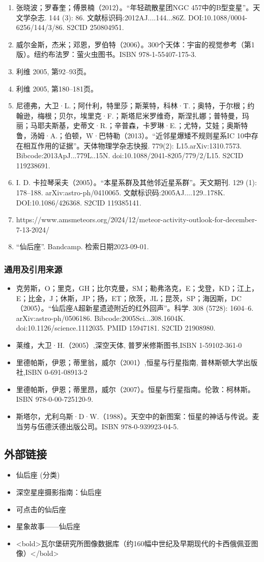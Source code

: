 \begin{enumerate}
\item 张晓波；罗春奎；傅景楠（2012）。“年轻疏散星团NGC 457中的B型变星”。天文学杂志. 144 (3): 86. 文献标识码:2012AJ....144...86Z. DOI:10.1088/0004-6256/144/3/86. S2CID 250804951.
\item 威尔金斯，杰米；邓恩，罗伯特（2006）。300个天体：宇宙的视觉参考（第1版）。纽约布法罗：萤火虫图书。ISBN 978-1-55407-175-3.
\item 利维 2005, 第92–93页。
\item 利维 2005, 第180–181页。
\item 尼德弗，大卫·L.；阿什利，特里莎；斯莱特，科林·T.；奥特，于尔根；约翰逊，梅根；贝尔，埃里克·F.；斯塔尼米罗维奇，斯涅扎娜；普特曼，玛丽；马耶夫斯基，史蒂文·R.；辛普森，卡罗琳·E.；尤特，艾娃；奥斯特鲁，汤姆·A.；伯顿，W·巴特勒（2013）。“近邻星爆矮不规则星系IC 10中存在相互作用的证据”。天体物理学杂志快报. 779(2): L15.arXiv:1310.7573. Bibcode:2013ApJ...779L..15N. doi:10.1088/2041-8205/779/2/L15. S2CID 119238691.
\item I. D. 卡拉琴采夫（2005）。“本星系群及其他邻近星系群”。天文期刊. 129 (1): 178–188. arXiv:astro-ph/0410065. 文献标识码:2005AJ....129..178K. DOI:10.1086/426368. S2CID 119385141.
\item https://www.amsmeteors.org/2024/12/meteor-activity-outlook-for-december-7-13-2024/
\item “仙后座”. Bandcamp. 检索日期2023-09-01.
\end{enumerate}
\subsubsection{通用及引用来源}
\begin{itemize}
\item 克劳斯，O；里克，GH；比尔克曼，SM；勒弗洛克，E；戈登，KD；江上，E；比金，J；休斯，JP；扬，ET；欣茨，JL；昆茨，SP；海因斯，DC（2005）。“仙后座A超新星遗迹附近的红外回声”。科学. 308 (5728): 1604–6. arXiv:astro-ph/0506186. Bibcode:2005Sci...308.1604K. doi:10.1126/science.1112035. PMID 15947181. S2CID 21908980.
\item 莱维，大卫·H.（2005）,深空天体, 普罗米修斯图书,ISBN 1-59102-361-0
\item 里德帕斯，伊恩；蒂里翁，威尔（2001）,恒星与行星指南, 普林斯顿大学出版社,ISBN 0-691-08913-2
\item 里德帕斯，伊恩；蒂里昂，威尔（2007）。恒星与行星指南。伦敦：柯林斯。ISBN 978-0-00-725120-9.
\item 斯塔尔，尤利乌斯·D·W.（1988）。天空中的新图案：恒星的神话与传说。麦当劳与伍德沃德出版公司。ISBN 978-0-939923-04-5.
\end{itemize}
\subsection{外部链接}
\begin{itemize}
\item 仙后座 (分类)
\item 深空星座摄影指南：仙后座
\item 可点击的仙后座
\item 星象故事——仙后座
\item <bold>瓦尔堡研究所图像数据库（约160幅中世纪及早期现代的卡西俄佩亚图像）</bold>
\end{itemize}
